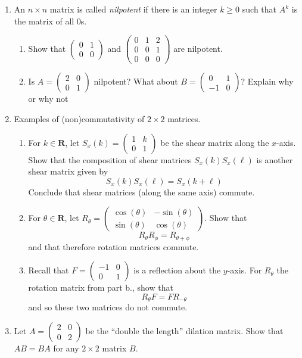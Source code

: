 \documentclass[12pt]{article}
\numberwithin{equation}{subsection}
\numberwithin{figure}{subsection}
\theoremstyle{note}
\begin{document}
\begin{enumerate}[label=\arabic*.]
	\item An $n\times n$ matrix is called \textit{nilpotent} if there is an integer $k\geq 0$ such that $A^k$ is the matrix of all $0$s. 
	\begin{enumerate}
		\item Show that $\begin{pmatrix} 0 & 1 \\ 0 & 0\end{pmatrix}$ and $\begin{pmatrix} 0 & 1 & 2 \\ 0 & 0 & 1 \\ 0 & 0 & 0\end{pmatrix}$ are nilpotent.
		\item Is $A=\begin{pmatrix} 2 & 0 \\ 0 & 1 \end{pmatrix}$ nilpotent? What about $B=\begin{pmatrix} 0 & 1 \\ -1 & 0 \end{pmatrix}$? Explain why or why not
	\end{enumerate} 
	
	\item Examples of (non)commutativity of $2\times 2$ matrices. 
	\begin{enumerate}
	\item For $k\in\mathbf{R}$, let $S_x(k)=\begin{pmatrix} 1 & k \\ 0 & 1\end{pmatrix}$ be the shear matrix along the $x$-axis. Show that the composition of shear matrices $S_x(k)S_x(\ell)$ is another shear matrix given by \[S_x(k)S_x(\ell)=S_x(k+\ell)\] Conclude that shear matrices (along the same axis) commute.
	\item For $\theta \in \mathbf{R}$, let  $R_{\theta}=\begin{pmatrix} \cos(\theta) & -\sin(\theta) \\ \sin(\theta) & \cos(\theta)\end{pmatrix}$. Show that \[ R_{\theta}R_{\phi}=R_{\theta+\phi}\]
	and that therefore rotation matrices commute. 
	\item Recall that $F=\begin{pmatrix} -1 & 0 \\ 0 & 1 \end{pmatrix}$ is a reflection about the $y$-axis. For $R_{\theta}$ the rotation matrix from part b., show that \[R_{\theta}F=FR_{-\theta}\] and so these two matrices do not commute. 
	\end{enumerate} 
	\item Let $A=\begin{pmatrix} 2 & 0 \\ 0 & 2 \end{pmatrix}$ be the ``double the length'' dilation matrix. Show that $AB=BA$ for any $2\times 2$ matrix $B$. 
	

\end{enumerate}
\end{document}
